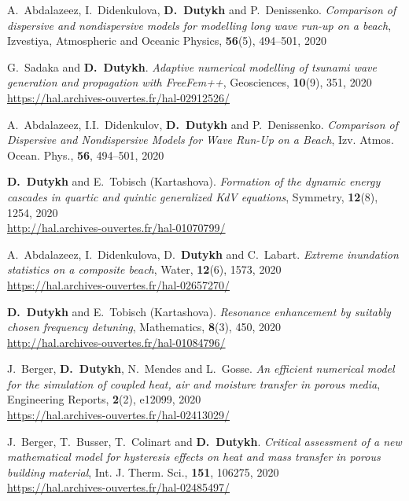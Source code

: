 \documentclass[final, a4paper, oneside, 12pt]{article}
\numberwithin{equation}{section}
\begin{document}
\begin{etaremune}
  \item A.~Abdalazeez, I.~Didenkulova, \textbf{D.~Dutykh} and P.~Denissenko. \textit{Comparison of dispersive and nondispersive models for modelling long wave run-up on a beach}, Izvestiya, Atmospheric and Oceanic Physics, \textbf{56}(5), 494--501, 2020 %
  
  \item G.~Sadaka and \textbf{D.~Dutykh}. \textit{Adaptive numerical modelling of tsunami wave generation and propagation with FreeFem++}, Geosciences, \textbf{10}(9), 351, 2020 \\ %
  \url{https://hal.archives-ouvertes.fr/hal-02912526/}
  
  \item A.~Abdalazeez, I.I.~Didenkulov, \textbf{D.~Dutykh} and P.~Denissenko. \textit{Comparison of Dispersive and Nondispersive Models for Wave Run-Up on a Beach}, Izv. Atmos. Ocean. Phys., \textbf{56}, 494--501, 2020 %
  
  \item \textbf{D.~Dutykh} and E.~Tobisch (Kartashova). \textit{Formation of the dynamic energy cascades in quartic and quintic generalized KdV equations}, Symmetry, \textbf{12}(8), 1254, 2020 \\ %
  \url{http://hal.archives-ouvertes.fr/hal-01070799/}
  
  \item A.~Abdalazeez, I.~Didenkulova, D.~\textbf{Dutykh} and C.~Labart. \textit{Extreme inundation statistics on a composite beach}, Water, \textbf{12}(6), 1573, 2020 \\ %
  \url{https://hal.archives-ouvertes.fr/hal-02657270/}
  
  \item \textbf{D.~Dutykh} and E.~Tobisch (Kartashova). \textit{Resonance enhancement by suitably chosen frequency detuning}, Mathematics, \textbf{8}(3), 450, 2020 \\ %
  \url{http://hal.archives-ouvertes.fr/hal-01084796/}
  
  \item J.~Berger, \textbf{D.~Dutykh}, N.~Mendes and L.~Gosse. \textit{An efficient numerical model for the simulation of coupled heat, air and moisture transfer in porous media}, Engineering Reports, \textbf{2}(2), e12099, 2020 \\ %
  \url{https://hal.archives-ouvertes.fr/hal-02413029/}
  
  \item J.~Berger, T.~Busser, T.~Colinart and \textbf{D.~Dutykh}. \textit{Critical assessment of a new mathematical model for hysteresis effects on heat and mass transfer in porous building material}, Int. J. Therm. Sci., \textbf{151}, 106275, 2020 \\ %
  \url{https://hal.archives-ouvertes.fr/hal-02485497/}
  

\end{etaremune}
\end{document}
